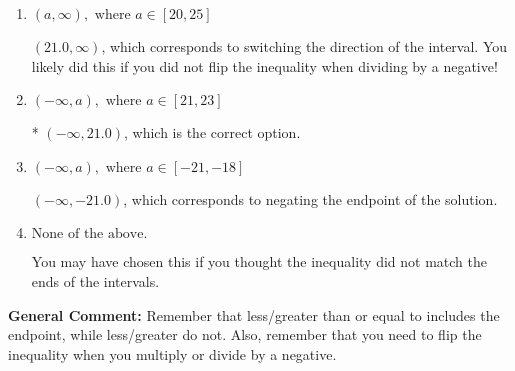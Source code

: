 \documentclass{extbook}[14pt]
\begin{document}
\begin{enumerate}
{\begin{enumerate}[label=\Alph*.]
 $(-21.0, \infty)$, which corresponds to switching the direction of the interval AND negating the endpoint. You likely did this if you did not flip the inequality when dividing by a negative as well as not moving values over to a side properly.
\item \( (a, \infty), \text{ where } a \in [20, 25] \)

 $(21.0, \infty)$, which corresponds to switching the direction of the interval. You likely did this if you did not flip the inequality when dividing by a negative!
\item \( (-\infty, a), \text{ where } a \in [21, 23] \)

* $(-\infty, 21.0)$, which is the correct option.
\item \( (-\infty, a), \text{ where } a \in [-21, -18] \)

 $(-\infty, -21.0)$, which corresponds to negating the endpoint of the solution.
\item \( \text{None of the above}. \)

You may have chosen this if you thought the inequality did not match the ends of the intervals.
\end{enumerate}

\textbf{General Comment:} Remember that less/greater than or equal to includes the endpoint, while less/greater do not. Also, remember that you need to flip the inequality when you multiply or divide by a negative.
}
\end{enumerate}
\end{document}
